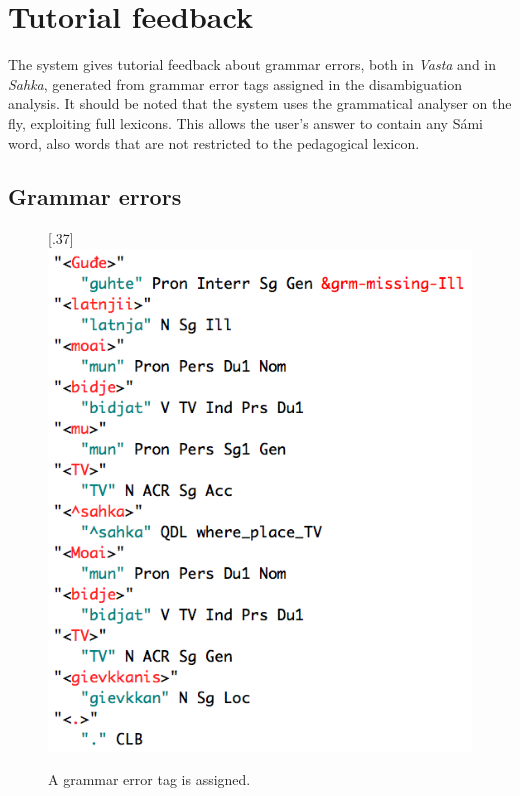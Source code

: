 \documentclass[11pt]{article}
\begin{document}
\section{Tutorial feedback} \label{tutorial}
The system gives tutorial feedback about grammar errors, both in \textit{Vasta} and in \textit{Sahka}, generated from grammar error tags assigned in the disambiguation analysis. It should be noted that the system uses the grammatical analyser on the fly, exploiting full lexicons. This allows the user's answer to contain any Sámi word, also words that are not restricted to the pedagogical lexicon.

\subsection{Grammar errors} \label{grammarerrors}

\begin{figure}[htbp]
\begin{center}
\scalebox{.37}[.37]{\includegraphics{presentation/img/gievkkanisAnalEng.png}}\\
\caption{A grammar error tag is assigned. }
\label{hivssetloc}
\end{center}
\end{figure}
\end{document}
